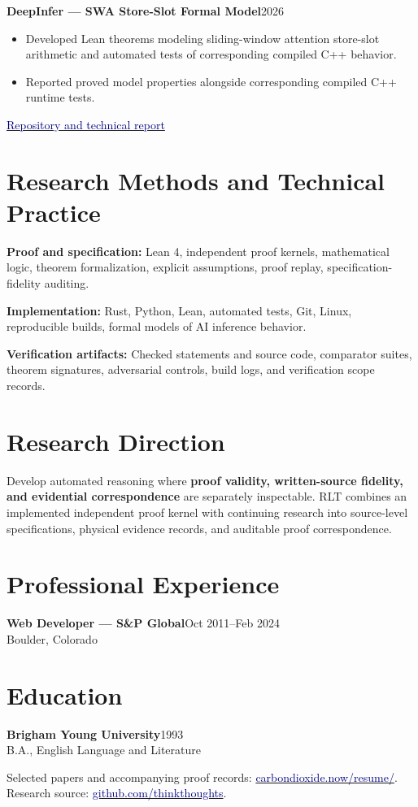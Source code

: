 \documentclass[10pt,letterpaper]{article}
\newcommand{\entry}[2]{\textbf{#1}\hfill {\small\color{muted}#2}\par}
\newcommand{\site}[2]{\href{#1}{\textcolor{navy}{#2}}}
\newcommand{\subline}[1]{{\small\color{muted}#1}\par}
\begin{document}
\entry{DeepInfer --- SWA Store-Slot Formal Model}{2026}
\begin{itemize}
  \item Developed Lean theorems modeling sliding-window attention store-slot arithmetic and automated tests of corresponding compiled C++ behavior.
  \item Reported proved model properties alongside corresponding compiled C++ runtime tests.
\end{itemize}
\subline{\site{https://github.com/thinkthoughts/DeepInfer}{Repository and technical report}}

\section*{Research Methods and Technical Practice}
\textbf{Proof and specification:} Lean 4, independent proof kernels, mathematical logic, theorem formalization, explicit assumptions, proof replay, specification-fidelity auditing.\par
\textbf{Implementation:} Rust, Python, Lean, automated tests, Git, Linux, reproducible builds, formal models of AI inference behavior.\par
\textbf{Verification artifacts:} Checked statements and source code, comparator suites, theorem signatures, adversarial controls, build logs, and verification scope records.

\section*{Research Direction}
Develop automated reasoning where \textbf{proof validity, written-source fidelity, and evidential correspondence} are separately inspectable. RLT combines an implemented independent proof kernel with continuing research into source-level specifications, physical evidence records, and auditable proof correspondence.

\section*{Professional Experience}
\textbf{Web Developer --- S\&P Global}\hfill {\small\color{muted}Oct 2011--Feb 2024}\\
{\small Boulder, Colorado}

\section*{Education}
\textbf{Brigham Young University}\hfill {\small\color{muted}1993}\\
{\small B.A., English Language and Literature}

\vfill
{\small\color{muted}Selected papers and accompanying proof records: \site{https://carbondioxide.now/resume/}{carbondioxide.now/resume/}. \quad Research source: \site{https://github.com/thinkthoughts}{github.com/thinkthoughts}.}
\end{document}
